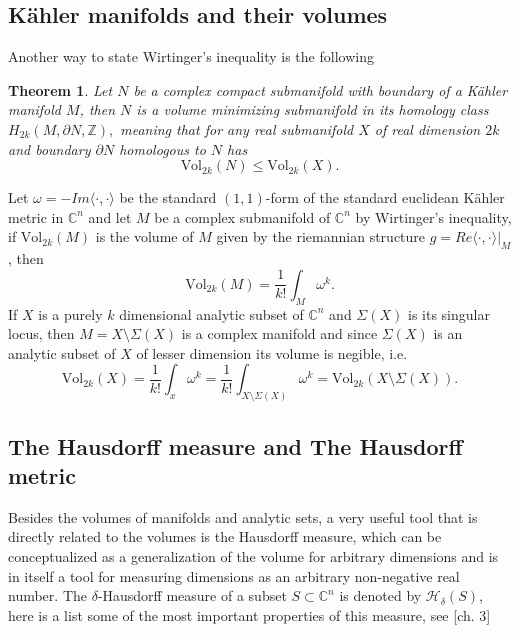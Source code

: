 \documentclass[12pt,twoside,a4paper]{report}
\newtheorem{theorem}{Theorem}[section]
\newcommand{\zah}{\ensuremath{ \mathbb Z }}
\newcommand{\con}{\ensuremath{\mathbb{C}^n}}
\begin{document}
\subsection{Kähler manifolds and their volumes}
\noindent Another way to state Wirtinger's inequality is the following
\begin{theorem}\label{wirtinger}
        Let $N$ be a complex compact submanifold with boundary of a Kähler manifold $M$, then $N$ is a volume minimizing
        submanifold in its homology class $H_{2k}(M,\partial N,\zah),$ meaning that for any real submanifold $X$ of
        real dimension $2k$ and boundary $\partial N$ homologous to $N$ has
        \[
          \textrm{Vol}_{2k}(N)\leq \textrm{Vol}_{2k}(X).
        \]
\end{theorem}
\noindent Let $\omega=-Im\langle\cdot,\cdot\rangle$ be the standard $(1,1)$-form of the standard euclidean Kähler metric in $\con$ and let $M$ be a complex submanifold of $\con$ by Wirtinger's inequality, if $\textrm{Vol}_{2k}(M)$ is the volume of $M$ given by the riemannian structure $g=Re\langle\cdot,\cdot\rangle\vert_{M}$, then
\begin{equation}
        \textrm{Vol}_{2k}(M)= \frac{1}{k!}\int_M \omega^k.
\end{equation}
If $X$ is a purely $k$ dimensional analytic subset of $\con$ and $\Sigma(X)$ is
its singular locus, then $M=X\setminus\Sigma(X)$ is a complex manifold and
since $\Sigma(X)$ is an analytic subset of $X$ of lesser dimension its volume is negible, i.e.
\[
    \textrm{Vol}_{2k}(X)= \frac{1}{k!}\int_{x} \omega^k=
                              \frac{1}{k!}\int_{X\setminus\Sigma(X)} \omega^k=
                                                            \textrm{Vol}_{2k}(X\setminus\Sigma(X)).
\]
\subsection{The Hausdorff measure and The Hausdorff metric}
\noindent Besides the volumes of manifolds and analytic sets, a very useful tool that is directly related to the volumes is the Hausdorff measure, which can be conceptualized as a generalization of the volume for arbitrary dimensions and is in itself a tool for measuring dimensions as an arbitrary non-negative real number.
The $\delta$-Hausdorff measure of a subset $S\subset\con$ is denoted by $\mathcal{H}_{\delta}(S)$, here is a list some of the most important properties of this measure, see \cite{Stolzenberg}[ch. 3]
\end{document}
